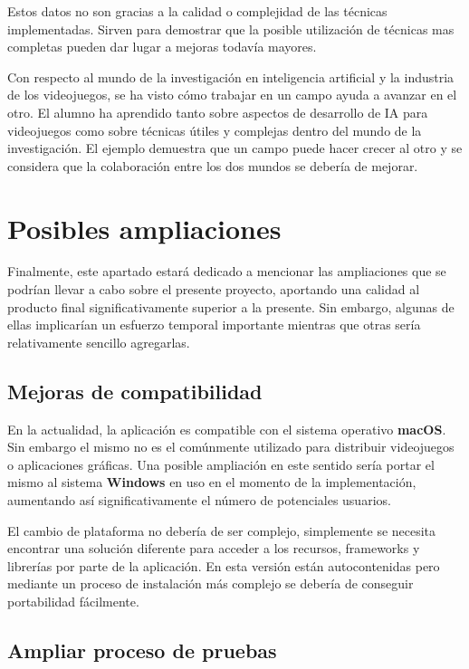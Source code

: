 \bigskip

Estos datos no son gracias a la calidad o complejidad de las técnicas implementadas. Sirven para demostrar que la posible utilización de técnicas mas completas pueden dar lugar a mejoras todavía mayores.

\bigskip

Con respecto al mundo de la investigación en inteligencia artificial y la industria de los videojuegos, se ha visto cómo trabajar en un campo ayuda a avanzar en el otro. El alumno ha aprendido tanto sobre aspectos de desarrollo de IA para videojuegos como sobre técnicas útiles y complejas dentro del mundo de la investigación. El ejemplo demuestra que un campo puede hacer crecer al otro y se considera que la colaboración entre los dos mundos se debería de mejorar.


\section{Posibles ampliaciones}

Finalmente, este apartado estará dedicado a mencionar las ampliaciones que se podrían llevar a cabo sobre el presente proyecto, aportando una calidad al producto final significativamente superior a la presente. Sin embargo, algunas de ellas implicarían un esfuerzo temporal importante mientras que otras sería relativamente sencillo agregarlas.

\subsection{Mejoras de compatibilidad}

En la actualidad, la aplicación es compatible con el sistema operativo \textbf{macOS}. Sin embargo el mismo no es el comúnmente utilizado para distribuir videojuegos o aplicaciones gráficas. Una posible ampliación en este sentido sería portar el mismo al sistema \textbf{Windows} en uso en el momento de la implementación, aumentando así significativamente el número de potenciales usuarios.

\bigskip

El cambio de plataforma no debería de ser complejo, simplemente se necesita encontrar una solución diferente para acceder a los recursos, frameworks y librerías por parte de la aplicación. En esta versión están autocontenidas pero mediante un proceso de instalación más complejo se debería de conseguir portabilidad fácilmente.

\subsection{Ampliar proceso de pruebas}

